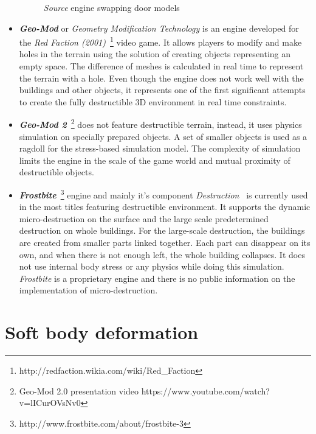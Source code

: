 \begin{itemize}
\begin{figure}[ht!]
\centering
\caption{\emph{Source} engine swapping door models}
\label{doors}
\end{figure}

\item \textbf{\emph{Geo-Mod}} \cite{geomod} or \emph{Geometry Modification Technology} is an engine developed for the \emph{Red Faction (2001)}~\footnote{http://redfaction.wikia.com/wiki/Red\_Faction} video game. It allows players to modify and make holes in the terrain using the solution of creating objects representing an empty space. The difference of meshes is calculated in real time to represent the terrain with a hole. Even though the engine does not work well with the buildings and other objects, it represents one of the first significant attempts to create the fully destructible 3D environment in real time constraints.

\item \textbf{\emph{Geo-Mod 2}}~\cite{geomod}\footnote{Geo-Mod 2.0 presentation video https://www.youtube.com/watch?v=lICurOVsNv0} does not feature destructible terrain, instead, it uses physics simulation on specially prepared objects. A set of smaller objects is used as a ragdoll for the stress-based simulation model. The complexity of simulation limits the engine in the scale of the game world and mutual proximity of destructible objects.


\item \textbf{\emph{Frostbite}}~\footnote{http://www.frostbite.com/about/frostbite-3} engine and mainly it's component \emph{Destruction}~\cite{destruction} is currently used in the most titles featuring destructible environment. It supports the dynamic micro-destruction on the surface and the large scale predetermined destruction on whole buildings. For the large-scale destruction, the buildings are created from smaller parts linked together. Each part can disappear on its own, and when there is not enough left, the whole building collapses. It does not use internal body stress or any physics while doing this simulation. \emph{Frostbite} is a proprietary engine and there is no public information on the implementation of micro-destruction.

\end{itemize}

\section{Soft body deformation}

